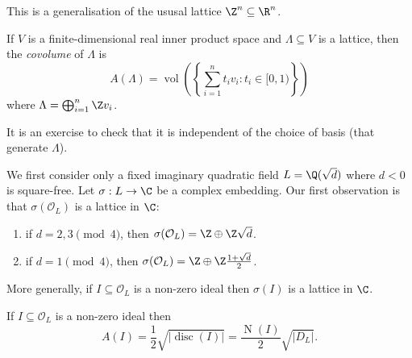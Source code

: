 \documentclass[a4paper]{article}
\renewcommand*{\O}{\mathcal{O}}
\DeclareMathOperator{\n}{N}
\DeclareMathOperator{\disc}{disc}
\DeclareMathOperator{\vol}{vol}
\begin{document}
This is a generalisation of the ususal lattice \(\Z^n \subseteq \R^n\).

\begin{definition}[Covolume]
  If \(V\) is a finite-dimensional real inner product space and \(\Lambda \subseteq V\) is a lattice, then the \emph{covolume} of \(\Lambda\) is
  \[
    A(\Lambda) = \vol\left( \left\{ \sum_{i = 1}^n t_iv_i: t_i \in [0, 1)\right\}\right)
  \]
  where \(\Lambda = \bigoplus_{i = 1}^n \Z v_i\).
\end{definition}

It is an exercise to check that it is independent of the choice of basis (that generate \(\Lambda\)).

We first consider only a fixed imaginary quadratic field \(L = \Q(\sqrt d)\) where \(d < 0\) is square-free. Let \(\sigma: L \to \C\) be a complex embedding. Our first observation is that \(\sigma(\O_L)\) is a lattice in \(\C\):
\begin{enumerate}
\item if \(d = 2, 3 \pmod 4\), then \(\sigma(\O_L) = \Z \oplus \Z\sqrt d\).
\item if \(d = 1 \pmod 4\), then \(\sigma(\O_L) = \Z \oplus \Z \frac{1 + \sqrt d}{2}\).
\end{enumerate}

More generally, if \(I \subseteq \O_L\) is a non-zero ideal then \(\sigma(I)\) is a lattice in \(\C\).

\begin{lemma}
  If \(I \subseteq \O_L\) is a non-zero ideal then
  \[
    A(I) = \frac{1}{2}\sqrt{|\disc(I)|} = \frac{\n(I)}{2}\sqrt{|D_L|}.
  \]
\end{lemma}
\end{document}
